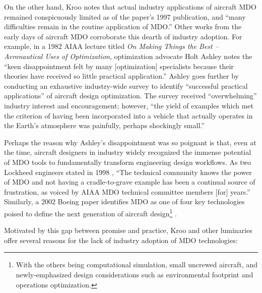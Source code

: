 \documentclass[12pt,vi,oneside,table]{report}
\begin{document}
    On the other hand, Kroo notes that actual industry applications of aircraft MDO remained conspicuously limited as of the paper's 1997 publication, and ``many difficulties remain in the routine application of MDO.'' \cite{kroo_multidisciplinary_1997} Other works from the early days of aircraft MDO corroborate this dearth of industry adoption. For example, in a 1982 AIAA lecture titled \textit{On Making Things the Best -- Aeronautical Uses of Optimization}, optimization advocate Holt Ashley notes the ``keen disappointment felt by many [optimization] specialists because their theories have received so little practical application.'' \cite{ashley_making_1982} Ashley goes further by conducting an exhaustive industry-wide survey to identify ``successful practical applications'' of aircraft design optimization. The survey received ``overwhelming'' industry interest and encouragement; however, ``the yield of examples which met the criterion of having been incorporated into a vehicle that actually operates in the Earth's atmosphere was painfully, perhaps shockingly small.''

    Perhaps the reason why Ashley's disappointment was so poignant is that, even at the time, aircraft designers in industry widely recognized the immense potential of MDO tools to fundamentally transform engineering design workflows. As two Lockheed engineers stated in 1998 \cite{radovcich_f22_1998}, ``The technical community knows the power of MDO and not having a cradle-to-grave example has been a continual source of frustration, as voiced by AIAA MDO technical committee members [for] years.'' Similarly, a 2002 Boeing paper identifies MDO as one of four key technologies poised to define the next generation of aircraft design\footnote{With the others being computational simulation, small uncrewed aircraft, and newly-emphasized design considerations such as environmental footprint and operations optimization.} \cite{mcmasters_airplane_2002}.

    Motivated by this gap between promise and practice, Kroo and other luminaries offer several reasons for the lack of industry adoption of MDO technologies:
\end{document}
